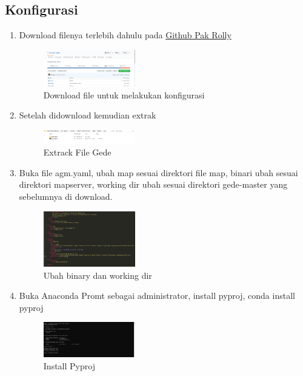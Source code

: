 \subsection{Konfigurasi}
\begin{enumerate}
    \item Download filenya terlebih dahulu pada \href{https://github.com/awangga/gede}{Github Pak Rolly}
    \hfill\break
    \begin{figure}[H]
		\includegraphics[width=4cm]{figures/1174039/tugas5/2.png}
		\centering
		\caption{Download file untuk melakukan konfigurasi}
    \end{figure}
    \item Setelah didownload kemudian extrak
    \hfill\break
    \begin{figure}[H]
		\includegraphics[width=4cm]{figures/1174039/tugas5/3.png}
		\centering
		\caption{Extrack File Gede}
    \end{figure}
    \item Buka file agm.yaml, ubah map sesuai direktori file map, binari ubah sesuai direktori mapserver, working dir ubah sesuai direktori gede-master yang sebelumnya di download.
    \hfill\break
    \begin{figure}[H]
		\includegraphics[width=4cm]{figures/1174039/tugas5/4.png}
		\centering
		\caption{Ubah binary dan working dir}
    \end{figure}
    \item Buka Anaconda Promt sebagai administrator, install pyproj, conda install pyproj
    \hfill\break
    \begin{figure}[H]
		\includegraphics[width=4cm]{figures/1174039/tugas5/5.png}
		\centering
		\caption{Install Pyproj}
    \end{figure} 
	\end{enumerate}
